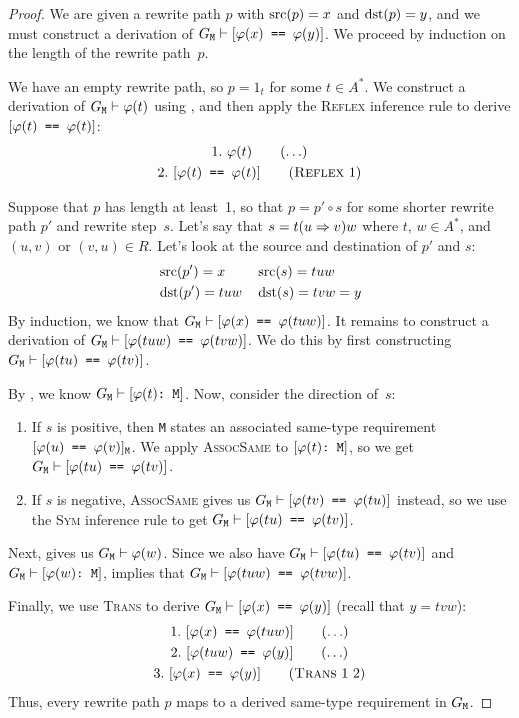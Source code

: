 \documentclass[../generics]{subfiles}
\begin{document}
\begin{proof}
We are given a rewrite path $p$ with $\operatorname{src}(p)=x$ and $\operatorname{dst}(p)=y$, and we must construct a derivation of $G_\texttt{M}\vdash[\texttt{$\varphi(x)$ == $\varphi(y)$}]$. We proceed by induction on the length of the rewrite path~$p$.

\BaseCase We have an empty rewrite path, so $p=1_t$ for some $t\in A^*$. We construct a derivation of $G_\texttt{M}\vdash\varphi(t)$ using , and then apply the \textsc{Reflex} inference rule to derive $[\texttt{$\varphi(t)$ == $\varphi(t)$}]$:
\begin{gather*}
\AnyStep{\varphi(t)}{1}\\
\ReflexStep{1}{$\varphi(t)$}{2}
\end{gather*}

\InductiveStep Suppose that $p$ has length at least~1, so that $p=p' \circ s$ for some shorter rewrite path $p'$ and rewrite step~$s$. Let's say that $s = t(u\Rightarrow v)w$ where $t$, $w\in A^*$, and $(u,v)$ or $(v,u)\in R$. Let's look at the source and destination of $p'$ and $s$:
\begin{align*}
&\operatorname{src}(p')=x
&&\operatorname{src}(s) = tuw\\
&\operatorname{dst}(p')=tuw
&&\operatorname{dst}(s) = tvw=y
\end{align*}
By induction, we know that $G_\texttt{M}\vdash[\texttt{$\varphi(x)$ == $\varphi(tuw)$}]$. It remains to construct a derivation of $G_\texttt{M}\vdash[\texttt{$\varphi(tuw)$ == $\varphi(tvw)$}]$. We do this by first constructing $G_\texttt{M}\vdash[\texttt{$\varphi(tu)$ == $\varphi(tv)$}]$.

By , we know $G_\texttt{M}\vdash[\texttt{$\varphi(t)$:~M}]$. Now, consider the direction of~$s$:
\begin{enumerate}
\item If $s$ is positive, then \texttt{M} states an associated same-type requirement $[\texttt{$\varphi(u)$ == $\varphi(v)$}]_\texttt{M}$. We apply \textsc{AssocSame} to $[\texttt{$\varphi(t)$:~M}]$, so we get $G_\texttt{M}\vdash[\texttt{$\varphi(tu)$ == $\varphi(tv)$}]$.
\item If $s$ is negative, \textsc{AssocSame} gives us $G_\texttt{M}\vdash[\texttt{$\varphi(tv)$ == $\varphi(tu)$}]$ instead, so we use the \textsc{Sym} inference rule to get $G_\texttt{M}\vdash[\texttt{$\varphi(tu)$ == $\varphi(tv)$}]$.
\end{enumerate}
Next,  gives us $G_\texttt{M}\vdash\varphi(w)$. Since we also have $G_\texttt{M}\vdash[\texttt{$\varphi(tu)$ == $\varphi(tv)$}]$ and $G_\texttt{M}\vdash[\texttt{$\varphi(w)$:~M}]$,  implies that $G_\texttt{M}\vdash[\texttt{$\varphi(tuw)$ == $\varphi(tvw)$}]$.

Finally, we use \textsc{Trans} to derive $G_\texttt{M}\vdash[\texttt{$\varphi(x)$ == $\varphi(y)$}]$ (recall that $y=tvw$):
\begin{gather*}
\AnyStep{\SameReqPhi{x}{tuw}}{1}\\
\AnyStep{\SameReqPhi{tuw}{y}}{2}\\
\TransStep{1}{2}{$\varphi(x)$}{$\varphi(y)$}{3}
\end{gather*}
Thus, every rewrite path $p$ maps to a derived same-type requirement in $G_\texttt{M}$.
\end{proof}
\end{document}
